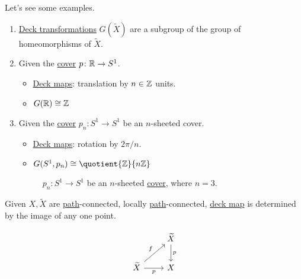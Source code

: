 \begin{eg}
	Let's see some examples.
	\begin{enumerate}
		\item \hyperref[def:deck-transformation]{Deck transformations} \(G(\widetilde{X} )\) are a subgroup of the group of homeomorphisms of \(\widetilde{X} \).
		\item Given the \hyperref[def:covering-map]{cover} \(p\colon \mathbb{\MakeUppercase{r}} \to S^1\).
		      \begin{itemize}
			      \item \hyperref[def:deck-transformation]{Deck maps}: translation by \(n\in \mathbb{\MakeUppercase{z}} \) units.
			      \item \(G(\mathbb{\MakeUppercase{r}} )\cong \mathbb{\MakeUppercase{z}} \)
		      \end{itemize}
		\item Given the \hyperref[def:covering-map]{cover} \(p_{n}\colon S^{1}\to S^1\) be an \(n\)-sheeted cover.
		      \begin{itemize}
			      \item \hyperref[def:deck-transformation]{Deck maps}: rotation by \(2\pi / n\).
			      \item \(G(S^1, p_{n})\cong \quotient{\mathbb{\MakeUppercase{z}} }{n \mathbb{\MakeUppercase{z}} } \)
		      \end{itemize}
		      \begin{figure}[H]
			      \centering
			      \caption{\(p_{n} \colon S^1 \to S^1\) be an \(n\)-sheeted \hyperref[def:covering-map]{cover}, where \(n = 3\).}
			      \label{fig:eg:lec17:N-sheeted-cover}
		      \end{figure}
	\end{enumerate}
\end{eg}

\begin{exercise}\label{ex:lec17}
	Given \(X, \widetilde{X} \) are \hyperref[def:path]{path}-connected, locally \hyperref[def:path]{path}-connected,
	\hyperref[def:deck-transformation]{deck map} is determined by the image of any one point.
\end{exercise}
\begin{answer}
	\[
		\begin{tikzcd}
			& {\widetilde{X}} \\
			{\widetilde{X}} & X
			\arrow["f", from=2-1, to=1-2]
			\arrow["p"', from=2-1, to=2-2]
			\arrow["p", from=1-2, to=2-2]
		\end{tikzcd}
	\]
\end{answer}

